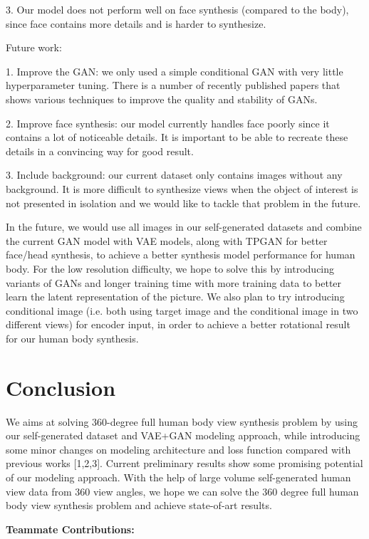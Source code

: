\documentclass[10pt,conference]{IEEEtran}
\begin{document}
3. Our model does not perform well on face synthesis (compared to the body), since face contains more details and is harder to synthesize.

Future work:

1. Improve the GAN: we only used a simple conditional GAN with very little hyperparameter tuning. There is a number of recently published papers that shows various techniques to improve the quality and stability of GANs.

2. Improve face synthesis: our model currently handles face poorly since it contains a lot of noticeable details. It is important to be able to recreate these details in a convincing way for good result. 

3. Include background: our current dataset only contains images without any background. It is more difficult to synthesize views when the object of interest is not presented in isolation and we would like to tackle that problem in the future.


In the future, we would use all images in our self-generated datasets and combine the current GAN model with VAE models, along with TPGAN for better face/head synthesis, to achieve a better synthesis model performance for human body. For the low resolution difficulty, we hope to solve this by introducing variants of GANs and longer training time with more training data to better learn the latent representation of the picture. We also plan to try introducing conditional image (i.e. both using target image and the conditional image in two different views) for encoder input, in order to achieve a better rotational result for our human body synthesis.


\section{Conclusion}
We aims at solving 360-degree full human body view synthesis problem by using our self-generated dataset and VAE+GAN modeling approach, while introducing some minor changes on modeling architecture and loss function compared with previous works [1,2,3].
Current preliminary results show some promising potential of our modeling approach. With the help of large volume self-generated human view data from 360 view angles, we hope we can solve the 360 degree full human body view synthesis problem and achieve state-of-art results.

\textbf{Teammate Contributions:}
\end{document}
